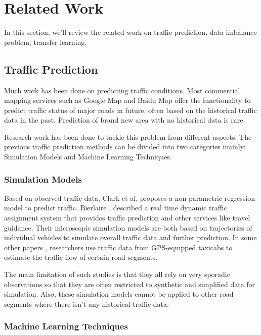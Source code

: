\section{Related Work}
\label{sec:related}

In this section, we'll review the related work on traffic prediction, data imbalance problem, transfer learning.

\subsection{Traffic Prediction}

Much work has been done on predicting traffic conditions. Most commercial mapping services
such as Google Map and Baidu Map offer the functionality 
to predict traffic status of major roads in future, often based on
the historical traffic data in the past. Prediction of brand new
area with no historical data is rare.

Research work has been done to tackle this problem from 
different aspects. The previous traffic prediction methods 
can be divided into two categories mainly: 
Simulation Models and Machine Learning Techniques. 

\subsubsection*{Simulation Models} 
Based on observed traffic data, Clark
et al.\cite{Clark2003Traffic} proposes a non-parametric regression 
model to predict traffic. Bierlaire \cite{Bierlaire1998DynaMIT}, 
described a real time dynamic traffic assignment system 
that provides traffic prediction and other services like travel 
guidance. 
Their microscopic simulation models are both based on 
trajectories of individual vehicles to simulate overall 
traffic data and further prediction. In some other papers 
\cite{KDD2011Driving}, researchers use traffic data from 
GPS-equipped taxicabs to estimate the traffic flow of 
certain road segments.
	
The main limitation of such studies is that they all rely on 
very sporadic observations so that they are often restricted 
to synthetic and simplified data for simulation. 
Also, these simulation models cannot be applied to other 
road segments where there isn't any historical traffic data.
	 
\subsubsection*{Machine Learning Techniques}
	 	
